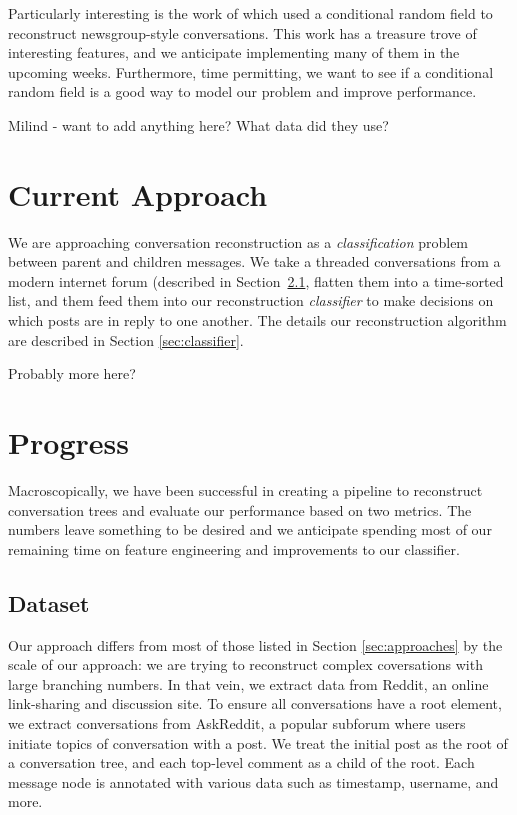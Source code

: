 \documentclass[10pt]{article}
\begin{document}
Particularly interesting is the work of \cite{Wang2011a} which used a conditional random
field to reconstruct newsgroup-style conversations. This work has a treasure trove of
interesting features, and we anticipate implementing many of them in the upcoming weeks.
Furthermore, time permitting, we want to see if a conditional random field is a good way
to model our problem and improve performance.

{Milind - want to add anything here? What data did they use?}

\section{Current Approach}
\label{sec:approach}
We are approaching conversation reconstruction as a \textit{classification} problem
between parent and children messages. We take a threaded conversations from a modern internet forum 
(described in Section~\ref{section:dataset}, flatten them into a time-sorted list, and them feed
them into our reconstruction \textit{classifier} to make decisions on which posts are in reply
to one another. The details our reconstruction algorithm are described in Section \ref{sec:classifier}.

{Probably more here?}

\section{Progress}
Macroscopically, we have
been successful in creating a pipeline to reconstruct conversation trees and
evaluate our performance based on two metrics. The numbers leave something to be desired and
we anticipate spending most of our remaining time on feature engineering and
improvements to our classifier.

\subsection{Dataset}
\label{section:dataset}
Our approach differs from most of those listed in Section \ref{sec:approaches}
by the scale of our approach: we are trying to reconstruct complex coversations
with large branching numbers.  In that vein, we extract data from Reddit, an
online link-sharing and discussion site. To ensure all conversations have a root
element, we extract conversations from AskReddit, a popular subforum where 
users initiate topics of conversation with a post. We treat the
initial post as the root of a conversation tree, and each top-level comment as a
child of the root. Each message node is annotated with various data such as
timestamp, username, and more.
\end{document}
